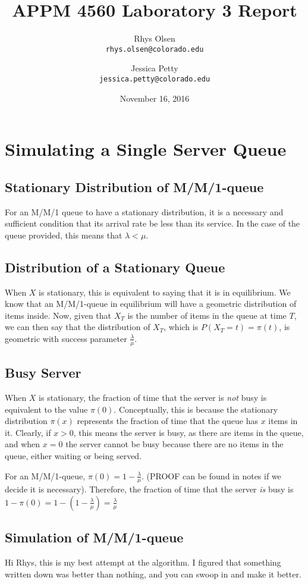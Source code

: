 \documentclass[11pt, oneside]{article}
\title{APPM 4560 Laboratory 3 Report}
\author{Rhys Olsen\\
\texttt{rhys.olsen@colorado.edu}
 \and Jessica Petty\\
 \texttt{jessica.petty@colorado.edu}
 }
\date{November 16, 2016}
\begin{document}
\maketitle
\section{Simulating a Single Server Queue}
\subsection{Stationary Distribution of M/M/1-queue}
For an M/M/1 queue to have a stationary distribution, it is a necessary and sufficient condition that its arrival rate be less than its service. In the case of the queue provided, this means that $\lambda < \mu$.

\subsection{Distribution of a Stationary Queue}
When $X$ is stationary, this is equivalent to saying that it is in equilibrium. We know that an M/M/1-queue in equilibrium will have a geometric distribution of items inside. Now, given that $X_T$ is the number of items in the queue at time $T$, we can then say that the distribution of $X_T$, which is $P(X_T = t) = \pi(t)$, is geometric with success parameter $\frac{\lambda}{\mu}$.

\subsection{Busy Server}
When $X$ is stationary, the fraction of time that the server is \textit{not} busy is equivalent to the value $\pi(0)$. Conceptually, this is because the stationary distribution $\pi(x)$ represents the fraction of time that the queue has $x$ items in it. Clearly, if $x > 0$, this means the server is busy, as there are items in the queue, and when $x=0$ the server cannot be busy because there are no items in the queue, either waiting or being served.

For an M/M/1-queue, $\pi(0)=1-\frac{\lambda}{\mu}$. (PROOF can be found in notes if we decide it is necessary). Therefore, the fraction of time that the server \textit{is} busy is $1-\pi(0)=1-(1-\frac{\lambda}{\mu})=\frac{\lambda}{\mu}$

\subsection{Simulation of M/M/1-queue}
Hi Rhys, this is my best attempt at the algorithm. I figured that something written down was better than nothing, and you can swoop in and make it better.
\end{document}
